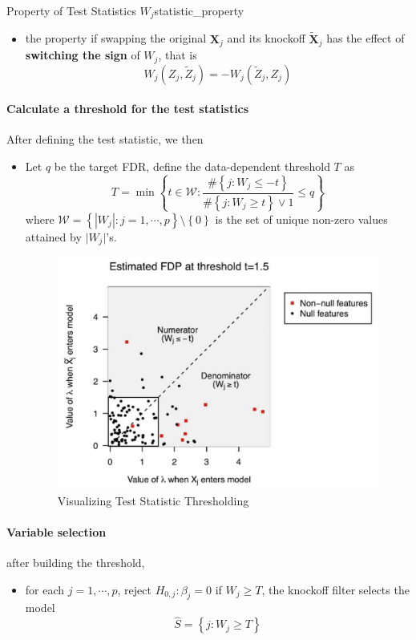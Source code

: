 \documentclass[twoside]{article}
\begin{document}
\begin{itemize}
\begin{definition}{Property of Test Statistics $W_j$}{statistic_property}
\begin{itemize}
            \item the  property if swapping the original $\mathbf{X}_j$ and its knockoff $\tilde{\mathbf{X}}_j$ has the effect of \textbf{switching the sign} of $W_j$, that is $$ W_j(Z_j,\tilde{Z}_j)= -W_j (\tilde{Z}_j,Z_j) $$
        \end{itemize}
    \end{definition}
\end{itemize}

\paragraph*{Calculate a threshold for the test statistics} After defining the test statistic, we then
\begin{itemize}
    \item Let $q$ be the target FDR, define the data-dependent threshold $T$ as $$ T =\min\left\{ t\in\mathcal{W}: \frac{\# \left\{j:W_j\leq -t \right\}}{\# \left\{j:W_j\geq t \right\} \vee 1} \leq  q \right\} $$ where $\mathcal{W}=\left\{ \left\vert W_j \right\vert: j=1,\cdots,p \right\} \setminus \left\{ 0 \right\}$ is the set of unique non-zero values attained by $\lvert W_j \rvert$'s.
    \begin{figure}[ht]
        \centering
        \includegraphics[width = 0.6 \textwidth]{figures/note17_visualizingFDR.png}
        \caption{Visualizing Test Statistic Thresholding}\label{fig:fdr_test_threshold_viz}
    \end{figure}
\end{itemize}

\paragraph*{Variable selection} after building the threshold, 
\begin{itemize}
    \item for each $j=1,\cdots,p$, reject $H_{0,j}:\beta_j=0$ if $W_j\geq T$, the knockoff filter selects the model $$ \hat{S} = \left\{ j:W_j\geq T \right\} $$
\end{itemize}
\end{document}
